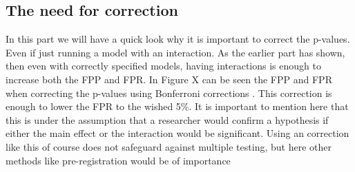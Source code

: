 \subsection{The need for correction}
In this part we will have a quick look why it is important to correct the p-values. Even if just running a model with an interaction. As the earlier part has shown, then even with correctly specified models, having interactions is enough to increase both the FPP and FPR. In Figure X can be seen the FPP and FPR when correcting the p-values using Bonferroni corrections \citep{dunn1961multiple}. This correction is enough to lower the FPR to the wished 5\%. It is important to mention here that this is under the assumption that a researcher would confirm a hypothesis if either the main effect or the interaction would be significant. Using an correction like this of course does not safeguard against multiple testing, but here other methods like pre-registration would be of importance  